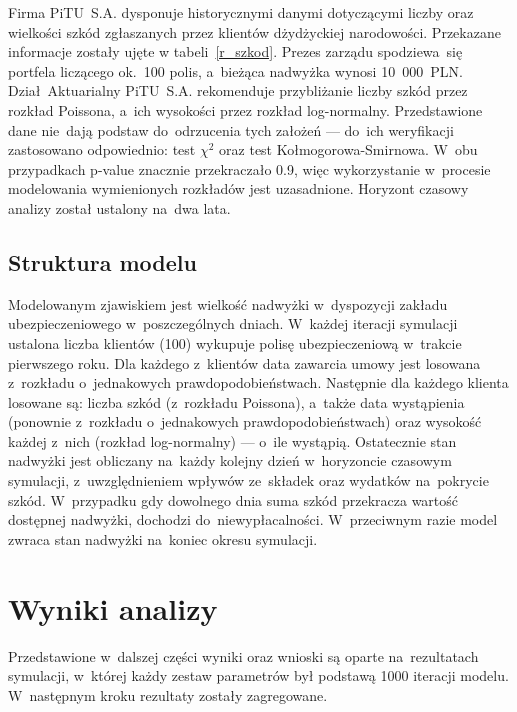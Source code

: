 \documentclass[12pt, a4paper, oneside]{mwart} %
\begin{document}
Firma PiTU~S.A. dysponuje historycznymi danymi dotyczącymi liczby oraz wielkości szkód zgłaszanych przez klientów dżydżyckiej narodowości. Przekazane informacje zostały ujęte w tabeli~\ref{r_szkod}. Prezes zarządu spodziewa~się portfela liczącego ok.~100 polis, a~bieżąca nadwyżka wynosi 10~000~PLN. Dział~Aktuarialny PiTU~S.A. rekomenduje przybliżanie liczby szkód przez rozkład Poissona, a~ich wysokości przez rozkład log-normalny. Przedstawione dane nie~dają podstaw do~odrzucenia tych założeń --- do~ich weryfikacji zastosowano odpowiednio: test $\chi^2$ oraz test Kołmogorowa-Smirnowa. W~obu przypadkach p-value znacznie przekraczało 0.9, więc wykorzystanie w~procesie modelowania wymienionych rozkładów jest uzasadnione. Horyzont czasowy analizy został ustalony na~dwa lata.

\subsection{Struktura modelu}
Modelowanym zjawiskiem jest wielkość nadwyżki w~dyspozycji zakładu ubezpieczeniowego w~poszczególnych dniach. W~każdej iteracji symulacji ustalona liczba klientów (100) wykupuje polisę ubezpieczeniową w~trakcie pierwszego roku. Dla każdego z~klientów data zawarcia umowy jest losowana z~rozkładu o~jednakowych prawdopodobieństwach. Następnie dla każdego klienta losowane są: liczba szkód (z~rozkładu Poissona), a~także data wystąpienia (ponownie z~rozkładu o~jednakowych prawdopodobieństwach) oraz wysokość każdej z~nich (rozkład log-normalny) --- o~ile wystąpią. Ostatecznie stan nadwyżki jest obliczany na~każdy kolejny dzień w~horyzoncie czasowym symulacji, z~uwzględnieniem wpływów ze~składek oraz wydatków na~pokrycie szkód. W~przypadku gdy dowolnego dnia suma szkód przekracza wartość dostępnej nadwyżki, dochodzi do~niewypłacalności. W~przeciwnym razie model zwraca stan nadwyżki na~koniec okresu symulacji.

\section{Wyniki analizy}
Przedstawione w~dalszej części wyniki oraz wnioski są oparte na~rezultatach symulacji, w~której każdy zestaw parametrów był podstawą 1000 iteracji modelu. W~następnym kroku rezultaty zostały zagregowane.
\end{document}
